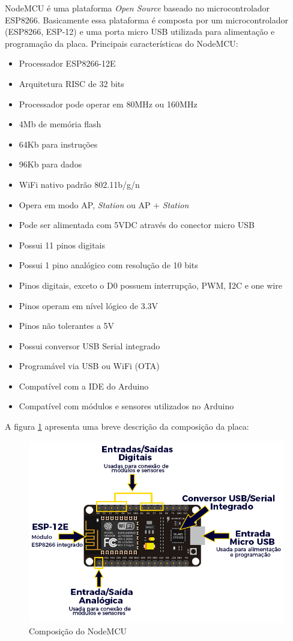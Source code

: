 NodeMCU é uma plataforma \textit{Open Source} baseado no microcontrolador ESP8266. Basicamente essa plataforma é composta por um microcontrolador (ESP8266, ESP-12) e uma porta micro USB utilizada para alimentação e programação da placa. Principais características do NodeMCU:
\begin{itemize}[itemsep=0em]
\item Processador ESP8266-12E
\item Arquitetura RISC de 32 bits
\item Processador pode operar em 80MHz ou 160MHz
\item 4Mb de memória flash
\item 64Kb para instruções
\item 96Kb para dados
\item WiFi nativo padrão 802.11b/g/n
\item Opera em modo AP, \textit{Station} ou AP + \textit{Station}
\item Pode ser alimentada com 5VDC através do conector micro USB
\item Possui 11 pinos digitais
\item Possui 1 pino analógico com resolução de 10 bits
\item Pinos digitais, exceto o D0 possuem interrupção, PWM, I2C e one wire
\item Pinos operam em nível lógico de 3.3V
\item Pinos não tolerantes a 5V
\item Possui conversor USB Serial integrado
\item Programável via USB ou WiFi (OTA)
\item Compatível com a IDE do Arduino
\item Compatível com módulos e sensores utilizados no Arduino
\end{itemize}

A figura \ref{fig:nodemcu} apresenta uma breve descrição da composição da placa:

\begin{figure}[H]
\centering
\includegraphics[scale=0.5]{./04-figuras/nodemcu.png}
\caption{Composição do NodeMCU}
\vspace{-\baselineskip}
\label{fig:nodemcu}
\end{figure}

